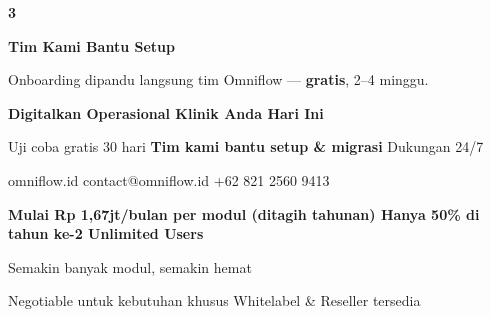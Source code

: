 \documentclass[a4paper]{article}
\begin{document}
\begin{center}
\begin{minipage}[t]{0.318\textwidth}
{\begin{minipage}[t][4.7cm][c]{\dimexpr\linewidth-2\fboxsep\relax}
            \begin{center}{\fontsize{22}{26}\selectfont\bfseries\color{BluePrimary} 3}\end{center}
            \vspace{2pt}
            \begin{center}
                {\fontsize{10}{13}\selectfont\bfseries\color{BlueDark} Tim Kami Bantu Setup}\par\vspace{3pt}
                {\fontsize{9}{12}\selectfont\color{TextDark} Onboarding dipandu langsung tim Omniflow --- \textbf{gratis}, 2--4 minggu.}
            \end{center}
        \end{minipage}}
\end{minipage}
\end{center}

\vspace{8pt}

{\setlength{\fboxsep}{10pt}\setlength{\fboxrule}{0pt}%
\noindent\colorbox{BluePrimary}{%
    \begin{minipage}{\dimexpr\textwidth-2\fboxsep\relax}
        \centering
        {\fontsize{13}{16}\selectfont\bfseries\color{White} Digitalkan Operasional Klinik Anda Hari Ini}\par\vspace{3pt}
        {\fontsize{9.5}{12}\selectfont\color{BlueMid} Uji coba gratis 30 hari \enspace\textbullet\enspace \textbf{Tim kami bantu setup \& migrasi} \enspace\textbullet\enspace Dukungan 24/7}\par\vspace{2pt}
        {\fontsize{9.5}{12}\selectfont\color{BlueLight} omniflow.id \enspace\textbullet\enspace contact@omniflow.id \enspace\textbullet\enspace +62 821 2560 9413}
    \end{minipage}}}


\vspace{6pt}

{\setlength{\fboxsep}{8pt}\setlength{\fboxrule}{0pt}%
\noindent\colorbox{BlueBg}{%
    \begin{minipage}{\dimexpr\textwidth-2\fboxsep\relax}
        \centering
        {\fontsize{9}{12}\selectfont\bfseries\color{BluePrimary}
        Mulai Rp 1,67jt/bulan per modul (ditagih tahunan) \enspace\textbullet\enspace Hanya 50\% di tahun ke-2 \enspace\textbullet\enspace Unlimited Users}\par\vspace{1pt}
        {\fontsize{8.5}{11}\selectfont\color{BlueDark}
        Semakin banyak modul, semakin hemat}\par\vspace{1pt}
        {\fontsize{8}{10}\selectfont\color{TextLight}
        Negotiable untuk kebutuhan khusus \enspace\textbullet\enspace Whitelabel \& Reseller tersedia}
    \end{minipage}}}

\restoregeometry
\pagestyle{empty}
\end{document}
